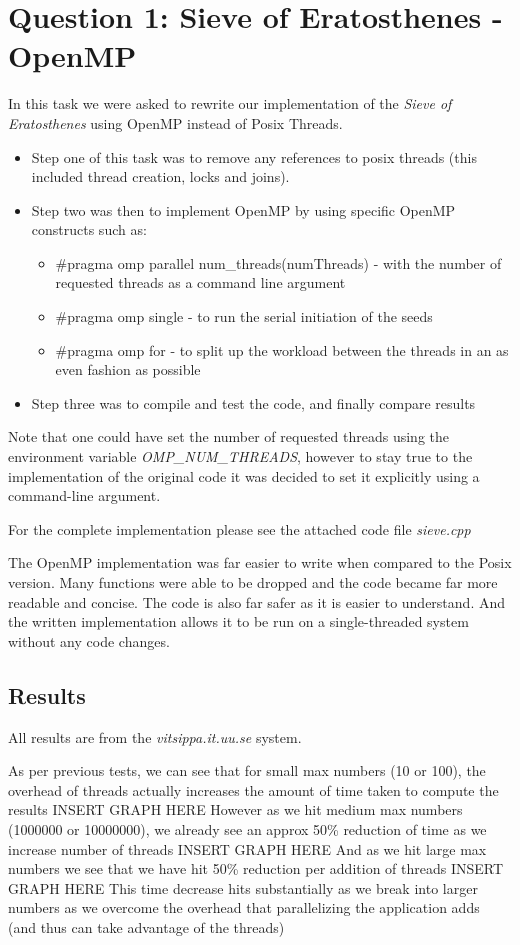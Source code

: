 \section{Question 1: Sieve of Eratosthenes - OpenMP}

In this task we were asked to rewrite our implementation of the \textit{Sieve of Eratosthenes} using OpenMP instead of Posix Threads. 
\begin{itemize}
  \item Step one of this task was to remove any references to posix threads (this included thread creation, locks and joins). 
  \item Step two was then to implement OpenMP by using specific OpenMP constructs such as:
  \begin{itemize}
    \item #pragma omp parallel num_threads(numThreads) - with the number of requested threads as a command line argument 
    \item #pragma omp single - to run the serial initiation of the seeds 
    \item #pragma omp for - to split up the workload between the threads in an as even fashion as possible
  \end{itemize}
  \item Step three was to compile and test the code, and finally compare results 
\end{itemize}
Note that one could have set the number of requested threads using the environment variable \textit{OMP_NUM_THREADS}, 
however to stay true to the implementation of the original code it was decided to set it explicitly using a command-line argument.

For the complete implementation please see the attached code file \textit{sieve.cpp}

The OpenMP implementation was far easier to write when compared to the Posix version. 
Many functions were able to be dropped and the code became far more readable and concise.
The code is also far safer as it is easier to understand. And the written implementation allows it to be run on a single-threaded system without any code changes. 

\subsection{Results}
All results are from the \textit{vitsippa.it.uu.se} system.

As per previous tests, we can see that for small max numbers (10 or 100), the overhead of threads actually increases the amount of time taken to compute the results 
{INSERT GRAPH HERE}
However as we hit medium max numbers (1000000 or 10000000), we already see an approx 50\% reduction of time as we increase number of threads
{INSERT GRAPH HERE}
And as we hit large max numbers we see that we have hit 50\% reduction per addition of threads 
{INSERT GRAPH HERE}
This time decrease hits substantially as we break into larger numbers as we overcome the overhead that parallelizing the application adds (and thus can take advantage of the threads)

